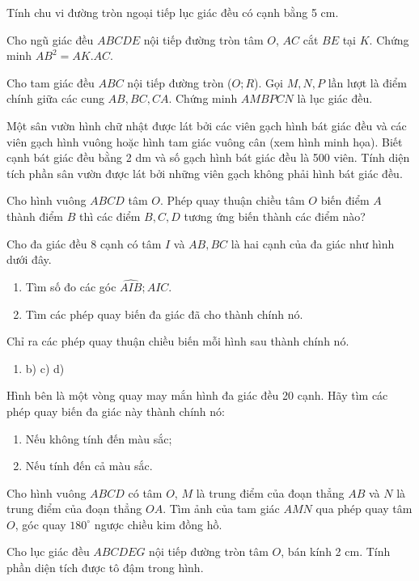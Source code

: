 \documentclass[%
    fontsize=12pt,%
    chapterprefix=false,%
    open=right,%
    twoside=false,%
    numbers=noenddot,%
    headings=optiontohead,%
    final,%
    DIV=15,%
    parskip=half %
]{scrbook}
\begin{document}
\begin{tuluan}

\item Tính chu vi đường tròn ngoại tiếp lục giác đều có cạnh bằng 5 cm.

\item Cho ngũ giác đều $ ABCDE $ nội tiếp đường tròn tâm $ O $, $ AC $ cắt $ BE $ tại $ K $. Chứng minh $ AB^2 = AK.AC $.

\item Cho tam giác đều $ ABC $ nội tiếp đường tròn ($ O; R $). Gọi $ M, N, P $ lần lượt là điểm chính giữa các cung $ AB, BC, CA $. Chứng minh $ AMBPCN $ là lục giác đều.

\item Một sân vườn hình chữ nhật được lát bởi các viên gạch hình bát giác đều và các viên gạch hình vuông hoặc hình tam giác vuông cân (xem hình minh họa). Biết cạnh bát giác đều bằng 2 dm và số gạch hình bát giác đều là 500 viên. Tính diện tích phần sân vườn được lát bởi những viên gạch không phải hình bát giác đều.

\item Cho hình vuông $ ABCD $ tâm $ O $. Phép quay thuận chiều tâm $ O $ biến điểm $ A $ thành điểm $ B $ thì các điểm $ B, C, D $ tương ứng biến thành các điểm nào?

\item Cho đa giác đều 8 cạnh có tâm $ I $ và $ AB, BC $ là hai cạnh của đa giác như hình dưới đây.
\begin{enumerate}[label=\alph*)]
  \item[a)] Tìm số đo các góc $ \widehat{AIB}; \widehat{AIC} $.
  \item[b)] Tìm các phép quay biến đa giác đã cho thành chính nó.
\end{enumerate}

\item Chỉ ra các phép quay thuận chiều biến mỗi hình sau thành chính nó.
\begin{enumerate}[label=\alph*)]
  \item[a)] b) c) d)
\end{enumerate}

\item Hình bên là một vòng quay may mắn hình đa giác đều 20 cạnh. Hãy tìm các phép quay biến đa giác này thành chính nó:
\begin{enumerate}[label=\alph*)]
  \item[a)] Nếu không tính đến màu sắc;
  \item[b)] Nếu tính đến cả màu sắc.
\end{enumerate}

\item Cho hình vuông $ABCD$ có tâm $O$, $M$ là trung điểm của đoạn thẳng $AB$ và $N$ là trung điểm của đoạn thẳng $OA$. Tìm ảnh của tam giác $AMN$ qua phép quay tâm $O$, góc quay $180^\circ$ ngược chiều kim đồng hồ.

\item Cho lục giác đều $ABCDEG$ nội tiếp đường tròn tâm $O$, bán kính 2 cm. Tính phần diện tích được tô đậm trong hình.

\end{tuluan}
\end{document}
